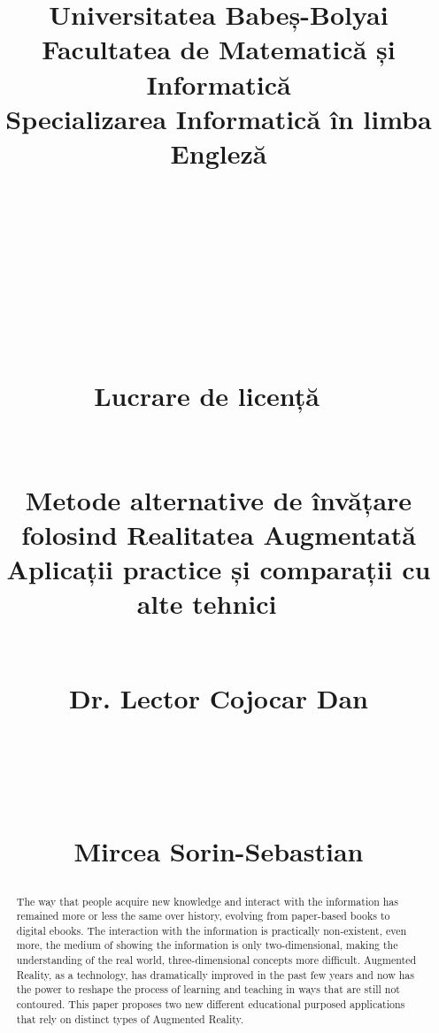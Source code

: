 \documentclass[12 pct]{report}
\begin{document}
\begin{titlepage}
\title{\vspace{-3.0cm}
  { \huge Universitatea Babeș-Bolyai\\
  Facultatea de Matematică și Informatică\\
  Specializarea Informatică în limba Engleză \\
  }
  \ \\
  \ \\
  \ \\
  \ \\
  \ \\
  \ \\
  {\huge Lucrare de licență}
  \ \\
  \ \\
  \ \\
  Metode alternative de învățare folosind Realitatea Augmentată\\
  Aplicații practice și comparații cu alte tehnici
  \ \\
  \ \\
  {%
    \begin{flushleft}%
  	 Dr. Lector  Cojocar Dan
  	\end{flushleft}}
  \ \\
  \ \\
  {%
  \begin{flushright}
  	Mircea Sorin-Sebastian
  \end{flushright} }
}%
\maketitle
\end{titlepage}

\begin{abstract}
The way that people acquire new knowledge and interact with the information has remained more or less the same over history, evolving from paper-based books to digital ebooks. 
The interaction with the information is practically non-existent, even more, the medium of showing the information is only two-dimensional, making the understanding of the real world, three-dimensional concepts more difficult. 
Augmented Reality, as a technology, has dramatically improved in the past few years and now has the power to reshape the process of learning and teaching in ways that are still not contoured. 
This paper proposes two new different educational purposed applications that rely on distinct types of Augmented Reality.
\end{abstract}
\end{document}
